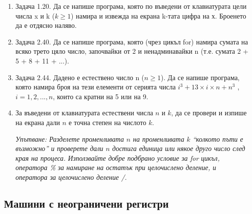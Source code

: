 \begin{enumerate}[resume]


	\item Задача 1.20.\cite{sbornik} Да се напише програма, която по въведени от клавиатурата цели числа x и k ($k \geq 1$) намира и извежда на екрана k-тата цифра на х. Броенето да е отдясно наляво.

	\item Задача 2.40.\cite{sbornik} Да се напише програма, която (чрез цикъл for) намира сумата на всяко трето цяло число, започвайки от 2 и ненадминавайки n (т.е. сумата 2 + 5 + 8 + 11 + ...).

	\item Задача 2.44.\cite{sbornik} Дадено е естествено число n ($n \geq 1$). Да се напише програма, която намира броя на тези елементи от серията числа $i^3 + 13 \times i \times n + n
	^3$ , $i = 1, 2, ..., n$, които са кратни на 5 или на 9.

	\item За въведени от клавиатурата естествени числа $n$ и $k$, да се провери и изпише на екрана дали $n$ е точна степен на числото $k$.

	\textit{Упътване: Разделете променливата $n$ на променливата $k$ ``колкото пъти е възможно'' и проверете дали $n$ достига единица или някое друго число след края на процеса. Използвайте добре подбрано условие за for цикъл, оператора \% за намиране на остатък при целочислено деление, и оператора за целочислено деление /.}

\end{enumerate}


\subsection {Машини с неограничени регистри}


